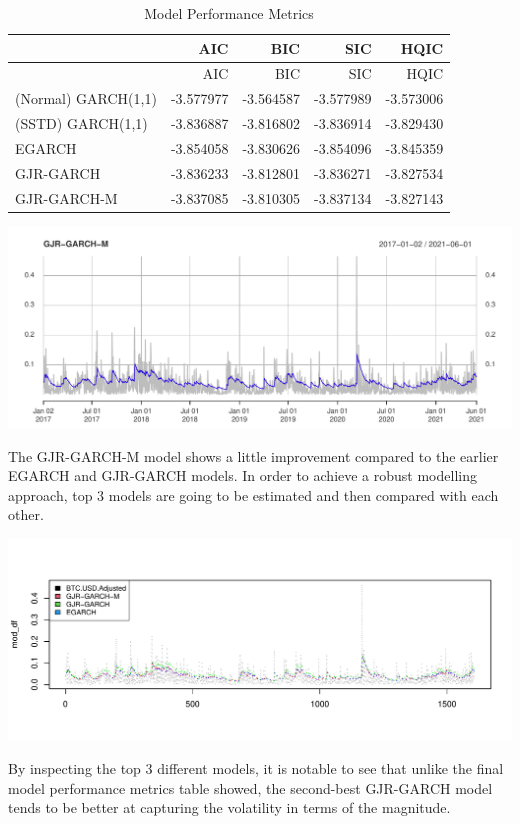 \documentclass[
  11pt,
]{article}
\begin{document}
\begin{longtable}[]{@{}lrrrr@{}}
\caption{Model Performance Metrics}\tabularnewline
\toprule
& AIC & BIC & SIC & HQIC \\
\midrule
\endfirsthead
\toprule
& AIC & BIC & SIC & HQIC \\
\midrule
\endhead
(Normal) GARCH(1,1) & -3.577977 & -3.564587 & -3.577989 & -3.573006 \\
(SSTD) GARCH(1,1) & -3.836887 & -3.816802 & -3.836914 & -3.829430 \\
EGARCH & -3.854058 & -3.830626 & -3.854096 & -3.845359 \\
GJR-GARCH & -3.836233 & -3.812801 & -3.836271 & -3.827534 \\
GJR-GARCH-M & -3.837085 & -3.810305 & -3.837134 & -3.827143 \\
\bottomrule
\end{longtable}

\includegraphics{ST436_Project_files/figure-latex/unnamed-chunk-26-1.pdf}

The GJR-GARCH-M model shows a little improvement compared to the earlier
EGARCH and GJR-GARCH models. In order to achieve a robust modelling
approach, top 3 models are going to be estimated and then compared with
each other.

\includegraphics{ST436_Project_files/figure-latex/unnamed-chunk-27-1.pdf}

By inspecting the top 3 different models, it is notable to see that
unlike the final model performance metrics table showed, the second-best
GJR-GARCH model tends to be better at capturing the volatility in terms
of the magnitude.
\end{document}

